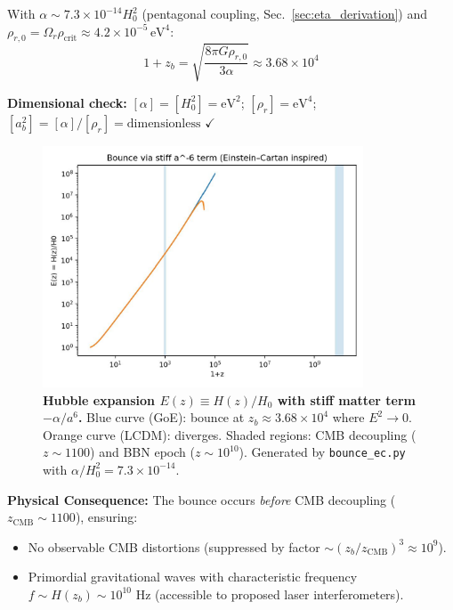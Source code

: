 \documentclass[12pt]{article}
\theoremstyle{definition}
\theoremstyle{plain}
\begin{document}
With $\alpha \sim 7.3 \times 10^{-14} H_0^2$ (pentagonal coupling, Sec.~\ref{sec:eta_derivation}) and $\rho_{r,0} = \Omega_r \rho_{\text{crit}} \approx 4.2 \times 10^{-5} \, \text{eV}^4$:
\begin{equation}
1 + z_b = \sqrt{\frac{8\pi G \rho_{r,0}}{3\alpha}} \approx 3.68 \times 10^4
\end{equation}

\textbf{Dimensional check:} $[\alpha] = [H_0^2] = \text{eV}^2$; $[\rho_r] = \text{eV}^4$; $[a_b^2] = [\alpha]/[\rho_r] = \text{dimensionless}$ $\checkmark$

\begin{figure}[h]
\centering
\includegraphics[width=0.85\textwidth]{figures/Ez_bounce.pdf}
\caption{\textbf{Hubble expansion $E(z) \equiv H(z)/H_0$ with stiff matter term $-\alpha/a^6$.} Blue curve (GoE): bounce at $z_b \approx 3.68 \times 10^4$ where $E^2 \to 0$. Orange curve (LCDM): diverges. Shaded regions: CMB decoupling ($z \sim 1100$) and BBN epoch ($z \sim 10^{10}$). Generated by \texttt{bounce\_ec.py} with $\alpha/H_0^2 = 7.3 \times 10^{-14}$.}
\label{fig:Ez_bounce}
\end{figure}

\textbf{Physical Consequence:} The bounce occurs \textit{before} CMB decoupling ($z_{\text{CMB}} \sim 1100$), ensuring:
\begin{itemize}
\item No observable CMB distortions (suppressed by factor $\sim (z_b/z_{\text{CMB}})^3 \approx 10^9$).
\item Primordial gravitational waves with characteristic frequency $f \sim H(z_b) \sim 10^{10}$ Hz (accessible to proposed laser interferometers).
\end{itemize}
\end{document}
